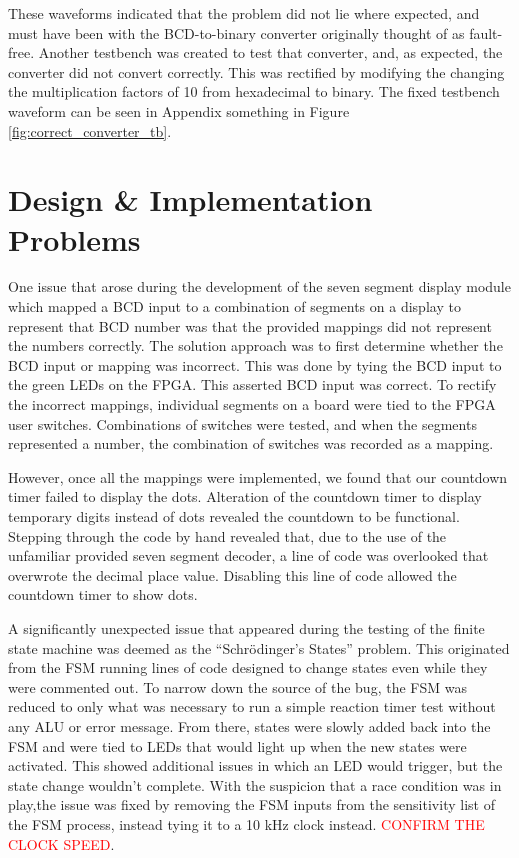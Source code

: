 \documentclass[11pt]{article}
\begin{document}
These waveforms indicated that the problem did not lie where expected, and must have been with the BCD-to-binary converter originally thought of as fault-free. Another testbench was created to test that converter, and, as expected, the converter did not convert correctly. This was rectified by modifying the changing the multiplication factors of 10 from hexadecimal to binary. The fixed testbench waveform can be seen in Appendix something in Figure \ref{fig:correct_converter_tb}.

\newpage

\section{Design \& Implementation Problems}

One issue that arose during the development of the seven segment display module which mapped a BCD input to a combination of segments on a display to represent that BCD number was that the provided mappings did not represent the numbers correctly. The solution approach was to first determine whether the BCD input or mapping was incorrect. This was done by tying the BCD input to the green LEDs on the FPGA. This asserted BCD input was correct. To rectify the incorrect mappings, individual segments on a board were tied to the FPGA user switches. Combinations of switches were tested, and when the segments represented a number, the combination of switches was recorded as a mapping.

However, once all the mappings were implemented, we found that our countdown timer failed to display the dots. Alteration of the countdown timer to display temporary digits instead of dots revealed the countdown to be functional. Stepping through the code by hand revealed that, due to the use of the unfamiliar provided seven segment decoder, a line of code was overlooked that overwrote the decimal place value. Disabling this line of code allowed the countdown timer to show dots.

A significantly unexpected issue that appeared during the testing of the finite state machine was deemed as the ``Schrödinger's States'' problem. This originated from the FSM running lines of code designed to change states even while they were commented out. To narrow down the source of the bug, the FSM was reduced to only what was necessary to run a simple reaction timer test without any ALU or error message. From there, states were slowly added back into the FSM and were tied to LEDs that would light up when the new states were activated. This showed additional issues in which an LED would trigger, but the state change wouldn't complete. With the suspicion that a race condition was in play,the issue was fixed by removing the FSM inputs from the sensitivity list of the FSM process, instead tying it to a 10 kHz clock instead. \textcolor{red}{CONFIRM THE CLOCK SPEED}.
\end{document}
